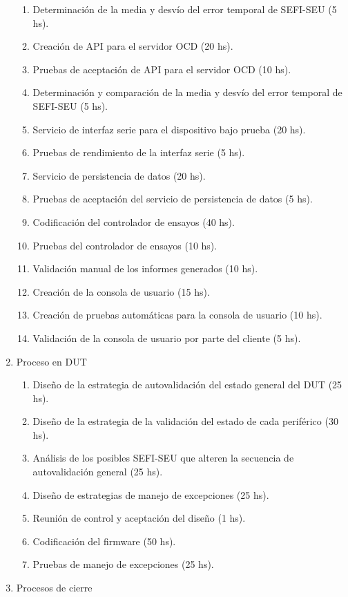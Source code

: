 \documentclass[
11pt, %
]{charter}
\begin{document}
\begin{enumerate}
\begin{enumerate}
	\item Determinación de la media y desvío del error temporal de SEFI-SEU (5 hs).
	\item Creación de API para el servidor OCD (20 hs).
	\item Pruebas de aceptación de API para el servidor OCD (10 hs).
	\item Determinación y comparación de la media y desvío del error temporal de SEFI-SEU (5 hs).
	\item Servicio de interfaz serie para el dispositivo bajo prueba (20 hs).
	\item Pruebas de rendimiento de la interfaz serie (5 hs).
	\item Servicio de persistencia de datos (20 hs).
	\item Pruebas de aceptación del servicio de persistencia de datos (5 hs).
	\item Codificación del controlador de ensayos (40 hs).
	\item Pruebas del controlador de ensayos (10 hs).
	\item Validación manual de los informes generados (10 hs).
	\item Creación de la consola de usuario (15 hs).
	\item Creación de pruebas automáticas para la consola de usuario (10 hs).
	\item Validación de la consola de usuario por parte del cliente (5 hs).
	\end{enumerate}
\item Proceso en DUT
	\begin{enumerate}
		\item Diseño de la estrategia de autovalidación del estado general del DUT (25 hs).
		\item Diseño de la estrategia de la validación del estado de cada periférico (30 hs).
		\item Análisis de los posibles SEFI-SEU que alteren la secuencia de autovalidación general (25 hs).
		\item Diseño de estrategias de manejo de excepciones (25 hs).
		\item Reunión de control y aceptación del diseño (1 hs).
		\item Codificación del firmware (50 hs).
		\item Pruebas de manejo de excepciones (25 hs).
	\end{enumerate}
\item Procesos de cierre
	\begin{enumerate}

\end{enumerate}
\end{enumerate}
\end{document}
